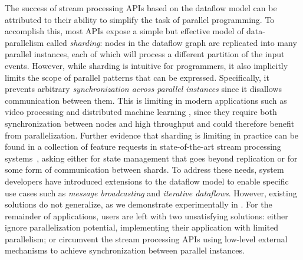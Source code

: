 The success of stream processing APIs based on the data\-flow model can be attributed to their ability to simplify the task of parallel programming. To accomplish this, most APIs expose a simple but effective model of data-parallelism called \emph{sharding}:
nodes in the dataflow graph are replicated into many parallel instances, each of which
will process a different partition of the input events.
However, while sharding is intuitive for programmers, it also implicitly limits the scope of parallel patterns that
can be expressed. Specifically, it prevents arbitrary
\emph{synchronization across parallel instances}
since it disallows communication between them.
This is limiting in modern applications such as video processing \cite{chienchun2018videoedge} and distributed machine learning \cite{otey2006fast}, since they require both synchronization between nodes and high throughput and could therefore benefit from parallelization.
Further evidence that sharding is limiting in practice
can be found in a collection of feature requests in state-of-the-art stream processing systems~\cite{FLIP8RescalableNonPartitionedStateApacheFlinkApacheSoftwareFoundation-2020-05-27,SEP27SideInputsforLocalStoresApacheSamzaApacheSoftwareFoundation-2020-05-27,KIP114KTablestatestoresandimprovedsemanticsApacheKafkaApacheSoftwareFoundation-2020-05-27}, asking either for state management that goes beyond replication or for some form of communication between shards.
To address these needs, system developers have introduced
extensions to the dataflow model to enable specific use cases such as  \emph{message broadcasting} and \emph{iterative dataflows}.
However, existing solutions do not generalize,
as we demonstrate experimentally in .
For the remainder of applications, users are left with two unsatisfying solutions: either ignore parallelization potential, implementing their application
with limited parallelism; or circumvent the stream processing APIs using low-level external mechanisms to achieve synchronization between parallel instances.

